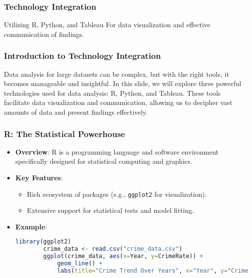 \documentclass[aspectratio=169]{beamer}
\begin{document}
\begin{frame}[fragile]
    \frametitle{Technology Integration}
    \begin{block}{Utilizing R, Python, and Tableau}
        For data visualization and effective communication of findings.
    \end{block}
\end{frame}

\begin{frame}[fragile]
    \frametitle{Introduction to Technology Integration}
    Data analysis for large datasets can be complex, but with the right tools, it becomes manageable and insightful. 
    In this slide, we will explore three powerful technologies used for data analysis: R, Python, and Tableau. 
    These tools facilitate data visualization and communication, allowing us to decipher vast amounts of data and present findings effectively.
\end{frame}

\begin{frame}[fragile]
    \frametitle{R: The Statistical Powerhouse}
    \begin{itemize}
        \item \textbf{Overview}: R is a programming language and software environment specifically designed for statistical computing and graphics.
        
        \item \textbf{Key Features}:
        \begin{itemize}
            \item Rich ecosystem of packages (e.g., \texttt{ggplot2} for visualization).
            \item Extensive support for statistical tests and model fitting.
        \end{itemize}
       
        \item \textbf{Example}:
        \begin{lstlisting}[language=R]
        library(ggplot2)
        crime_data <- read.csv("crime_data.csv")
        ggplot(crime_data, aes(x=Year, y=CrimeRate)) + 
            geom_line() + 
            labs(title="Crime Trend Over Years", x="Year", y="Crime Rate")
        \end{lstlisting}
    \end{itemize}
\end{frame}
\end{document}
